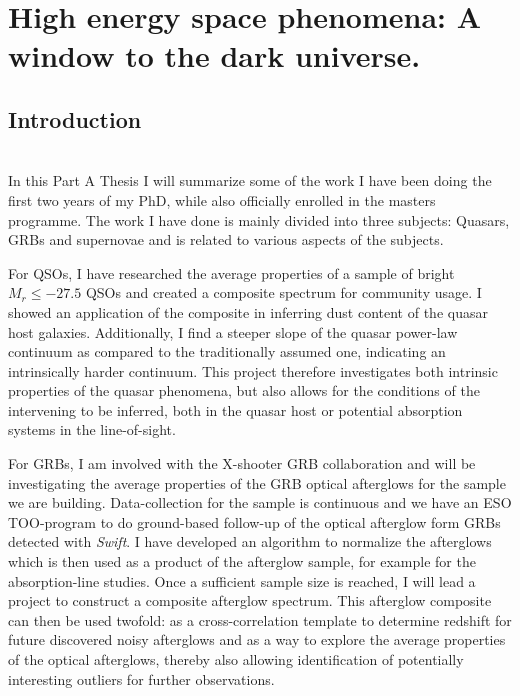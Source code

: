 %
\chapter{High energy space phenomena: A window to the dark universe.}

\section{Introduction}
\label{sec:intro}

 \\

In this Part A Thesis I will summarize some of the work I have been doing the
first two years of my PhD, while also officially enrolled in the masters
programme. The work I have done is mainly divided into three subjects: Quasars,
GRBs and supernovae and is related to various aspects of the subjects. 

For QSOs, I have researched the average properties of a sample of bright $M_{r}
\leq -27.5$ QSOs and created a composite spectrum for community usage. I showed
an application of the composite in inferring dust content of the quasar host
galaxies. Additionally, I find a steeper slope of the quasar power-law continuum
as compared to the traditionally assumed one, indicating an intrinsically harder
continuum. This project therefore investigates both intrinsic properties of the
quasar phenomena, but also allows for the conditions of the intervening to be
inferred, both in the quasar host or potential absorption systems in the
line-of-sight.

For GRBs, I am involved with the X-shooter GRB collaboration and will be
investigating the average properties of the GRB optical afterglows for the
sample we are building. Data-collection for the sample is continuous and we have
an ESO TOO-program to do ground-based follow-up of the optical afterglow form
GRBs detected with \textit{Swift}.  I have developed an algorithm to normalize
the afterglows which is then used  as a product of the afterglow sample, for
example for the absorption-line studies. Once a sufficient sample size is
reached, I will lead a project to construct a composite afterglow spectrum. This
afterglow composite can then be used twofold: as a cross-correlation template to
determine redshift for future discovered noisy afterglows and as a way to
explore the average properties of the optical afterglows, thereby also allowing
identification of potentially interesting outliers for further observations. 


